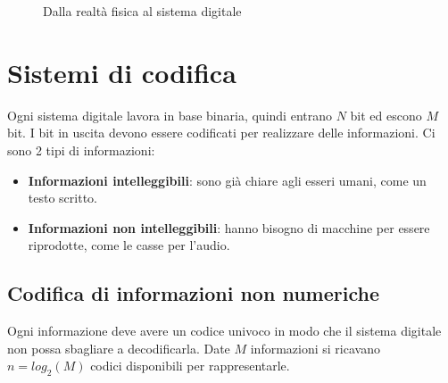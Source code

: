 \documentclass[a4paper]{article}
\theoremstyle{break}
\theoremstyle{break}
\theoremstyle{break}
\theoremstyle{break}
\begin{document}
\begin{figure}[h]
	\centering
	\caption{Dalla realtà fisica al sistema digitale}
\end{figure}


\section{Sistemi di codifica}
Ogni sistema digitale lavora in base binaria, quindi entrano \( N \)  bit
ed escono \( M \)  bit. I bit in uscita devono essere codificati per
realizzare delle informazioni. Ci sono 2 tipi di informazioni:

\begin{itemize}
	\item \textbf{Informazioni intelleggibili}: sono già chiare agli esseri umani,
	      come un testo scritto.
	\item \textbf{Informazioni non intelleggibili}: hanno bisogno di macchine
	      per essere riprodotte, come le casse per l'audio.
\end{itemize}

\subsection{Codifica di informazioni non numeriche}
Ogni informazione deve avere un codice univoco in modo che il sistema
digitale non possa sbagliare a decodificarla. Date \( M \)  informazioni si
ricavano \( n = log_2{(M)} \)  codici disponibili per rappresentarle.
\end{document}
